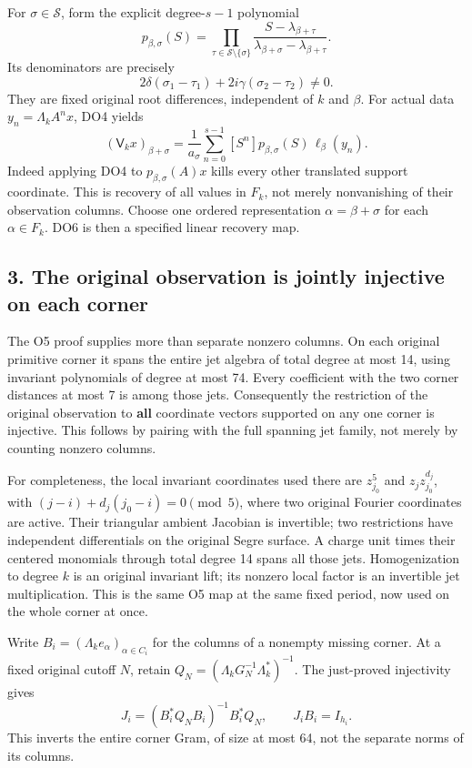 \documentclass[11pt]{article}
\begin{document}
For \(\sigma\in\mathcal S\), form the explicit degree-\(s-1\) polynomial \[
\boxed{\displaystyle
p_{\beta,\sigma}(S)=
\prod_{\tau\in\mathcal S\setminus\{\sigma\}}
\frac{S-\lambda_{\beta+\tau}}
{\lambda_{\beta+\sigma}-\lambda_{\beta+\tau}}.}
\tag{DO5}
\] Its denominators are precisely \[
2\delta(\sigma_1-\tau_1)+2i\gamma(\sigma_2-\tau_2)\ne0.
\] They are fixed original root differences, independent of \(k\) and \(\beta\). For actual data \(y_n=\Lambda_k A^n x\), DO4 yields \[
\boxed{\displaystyle
(\mathsf V_kx)_{\beta+\sigma}
=\frac1{a_\sigma}\sum_{n=0}^{s-1}
[S^n]p_{\beta,\sigma}(S)\,\ell_\beta(y_n).}
\tag{DO6}
\] Indeed applying DO4 to \(p_{\beta,\sigma}(A)x\) kills every other translated support coordinate. This is recovery of all values in \(F_k\), not merely nonvanishing of their observation columns. Choose one ordered representation \(\alpha=\beta+\sigma\) for each \(\alpha\in F_k\). DO6 is then a specified linear recovery map.

\subsection{3. The original observation is jointly injective on each corner}\label{pdepth:the-original-observation-is-jointly-injective-on-each-corner}

The O5 proof supplies more than separate nonzero columns. On each original primitive corner it spans the entire jet algebra of total degree at most 14, using invariant polynomials of degree at most 74. Every coefficient with the two corner distances at most 7 is among those jets. Consequently the restriction of the original observation to \textbf{all} coordinate vectors supported on any one corner is injective. This follows by pairing with the full spanning jet family, not merely by counting nonzero columns.

For completeness, the local invariant coordinates used there are \(z_{j_0}^5\) and \(z_jz_{j_0}^{d_j}\), with \((j-i)+d_j(j_0-i)=0\pmod5\), where two original Fourier coordinates are active. Their triangular ambient Jacobian is invertible; two restrictions have independent differentials on the original Segre surface. A charge unit times their centered monomials through total degree 14 spans all those jets. Homogenization to degree \(k\) is an original invariant lift; its nonzero local factor is an invertible jet multiplication. This is the same O5 map at the same fixed period, now used on the whole corner at once.

Write \(B_i=(\Lambda_k e_\alpha)_{\alpha\in C_i}\) for the columns of a nonempty missing corner. At a fixed original cutoff \(N\), retain \(Q_N=(\Lambda_kG_N^{-1}\Lambda_k^*)^{-1}\). The just-proved injectivity gives \[
J_i=(B_i^*Q_NB_i)^{-1}B_i^*Q_N,\qquad J_iB_i=I_{h_i}.
\tag{DO7}
\] This inverts the entire corner Gram, of size at most 64, not the separate norms of its columns.
\end{document}
